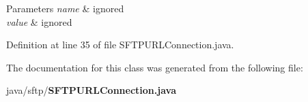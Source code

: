 \begin{DoxyParams}{Parameters}
{\em name} & ignored \\
\hline
{\em value} & ignored \\
\hline
\end{DoxyParams}


Definition at line 35 of file S\-F\-T\-P\-U\-R\-L\-Connection.\-java.



The documentation for this class was generated from the following file\-:\begin{DoxyCompactItemize}
\item 
java/sftp/{\bf S\-F\-T\-P\-U\-R\-L\-Connection.\-java}\end{DoxyCompactItemize}
